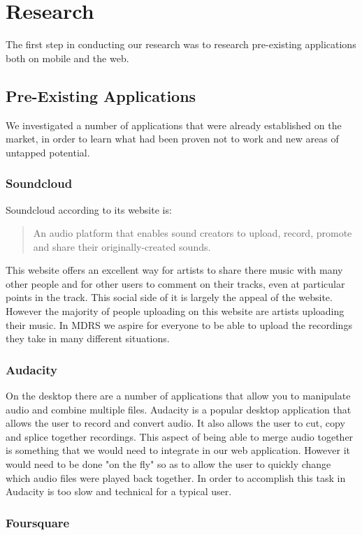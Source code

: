 \documentclass{l3proj}
\begin{document}
\chapter{Research}
\label{Research}

The first step in conducting our research was to research pre-existing applications both on mobile and the web.

\section{Pre-Existing Applications}
We investigated a number of applications that were already established on the market, in order to learn what had been proven not to work and new areas of untapped potential.

\subsection{Soundcloud}
Soundcloud according to its website is:
\blockquote{An audio platform that enables sound creators to upload, record, promote and share their originally-created sounds.}
This website offers an excellent way for artists to share there music with many other people and for other users to comment on their tracks, even at particular points in the track. This social side of it is largely the appeal of the website. However the majority of people uploading on this website are artists uploading their music. In MDRS we aspire for everyone to be able to upload the recordings they take in many different situations.

\subsection{Audacity}

On the desktop there are a number of applications that allow you to manipulate audio and combine multiple files. Audacity is a popular desktop application that allows the user to record and convert audio. It also allows the user to cut, copy and splice together recordings. This aspect of being able to merge audio together is something that we would need to integrate in our web application. However it would need to be done "on the fly" so as to allow the user to quickly change which audio files were played back together. In order to accomplish this task in Audacity is too slow and technical for a typical user.

\subsection{Foursquare}
\end{document}
